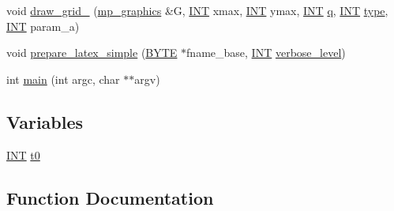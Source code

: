 \begin{DoxyCompactItemize}
\item 
void \mbox{\hyperlink{field_8_c_a7d63b7cbb41f5eee173cf829ac238a23}{draw\+\_\+grid\+\_\+}} (\mbox{\hyperlink{classmp__graphics}{mp\+\_\+graphics}} \&G, \mbox{\hyperlink{galois_8h_a09fddde158a3a20bd2dcadb609de11dc}{I\+NT}} xmax, \mbox{\hyperlink{galois_8h_a09fddde158a3a20bd2dcadb609de11dc}{I\+NT}} ymax, \mbox{\hyperlink{galois_8h_a09fddde158a3a20bd2dcadb609de11dc}{I\+NT}} \mbox{\hyperlink{simeon_8_c_a92cbb483a3b27ae1a0dbfcb125ce216f}{q}}, \mbox{\hyperlink{galois_8h_a09fddde158a3a20bd2dcadb609de11dc}{I\+NT}} \mbox{\hyperlink{_l_i_b_2_g_a_l_o_i_s_2dlx_8_c_ad241c8005abf9f323e9fffec67f55abf}{type}}, \mbox{\hyperlink{galois_8h_a09fddde158a3a20bd2dcadb609de11dc}{I\+NT}} param\+\_\+a)
\item 
void \mbox{\hyperlink{field_8_c_a528dbc3668d6d9107524c9970d685d16}{prepare\+\_\+latex\+\_\+simple}} (\mbox{\hyperlink{galois_8h_ab6cc7b4aeb6ea31aba2b3fbfc83ff5e6}{B\+Y\+TE}} $\ast$fname\+\_\+base, \mbox{\hyperlink{galois_8h_a09fddde158a3a20bd2dcadb609de11dc}{I\+NT}} \mbox{\hyperlink{simeon_8_c_a818073fbcc2f439e7c56952f67386122}{verbose\+\_\+level}})
\item 
int \mbox{\hyperlink{field_8_c_a3c04138a5bfe5d72780bb7e82a18e627}{main}} (int argc, char $\ast$$\ast$argv)
\end{DoxyCompactItemize}
\subsection*{Variables}
\begin{DoxyCompactItemize}
\item 
\mbox{\hyperlink{galois_8h_a09fddde158a3a20bd2dcadb609de11dc}{I\+NT}} \mbox{\hyperlink{field_8_c_a4268f4fe222ffb119218a0199f5e1904}{t0}}
\end{DoxyCompactItemize}


\subsection{Function Documentation}
\mbox{\label{field_8_c_acc89357b4d9e622a5351e636fb9909ae}} 
